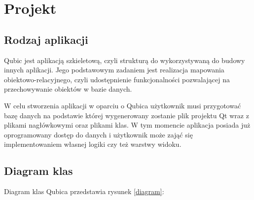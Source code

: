\documentclass[12pt]{report}
\begin{document}
\section{Projekt}

\subsection{Rodzaj aplikacji}

Qubic jest aplikacją szkieletową, czyli strukturą do wykorzystywaną do budowy innych aplikacji. Jego podstawowym zadaniem jest realizacja mapowania obiektowo-relacyjnego,
czyli udostępnienie funkcjonalności pozwalającej na przechowywanie obiektów w bazie danych.

W celu stworzenia aplikacji w oparciu o Qubica użytkownik musi przygotować bazę danych na podstawie której wygenerowany zostanie plik projektu Qt wraz z plikami nagłówkowymi
oraz plikami klas. W tym momencie aplikacja posiada już oprogramowany dostęp do danych i użytkownik może zająć się implementowaniem własnej logiki czy też warstwy widoku.

\subsection{Diagram klas}

Diagram klas Qubica przedstawia rysunek \ref{diagram}:
\end{document}

